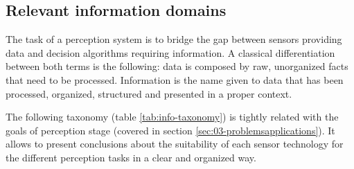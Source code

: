 \subsection{Relevant information domains}
\label{sec:03-d-information-domains}

The task of a perception system is to bridge the gap between sensors providing 
data and decision algorithms requiring information.
A classical differentiation between both terms is the following: data is 
composed by raw, unorganized facts that need to be processed. 
Information is the name given to data that has been processed, organized, 
structured and presented in a proper context.

The following taxonomy (table \ref{tab:info-taxonomy}) is tightly related with 
the goals of perception stage (covered in section
\ref{sec:03-problemsapplications}). It allows to present conclusions about the
suitability of each sensor technology for the different perception tasks in a
clear and organized way.

